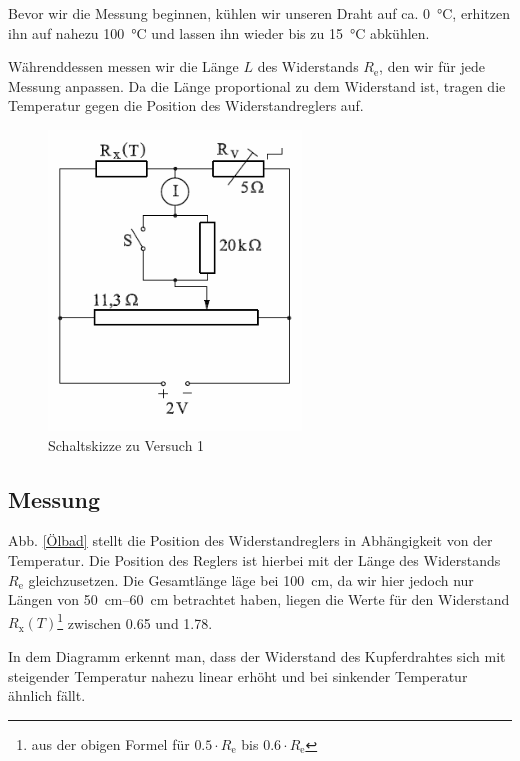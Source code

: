 \documentclass[11pt,a4paper,titlepage, ngerman]{article}
\begin{document}
			Bevor wir die Messung beginnen, kühlen wir unseren Draht auf ca. \SI{0}{\celsius}, erhitzen ihn auf nahezu \SI{100}{\celsius} und lassen ihn wieder bis zu \SI{15}{\celsius} abkühlen.
			
			Währenddessen messen wir die Länge $L$ des Widerstands $R_\text{e}$, den wir für jede Messung anpassen. Da die Länge proportional zu dem Widerstand ist, tragen die Temperatur gegen die Position des Widerstandreglers auf.
						
			\begin{figure}
				\centering
				\includegraphics[width=0.6\textwidth]{Versuch2.png}
				\caption{Schaltskizze zu Versuch 1}
				\label{Schaltskizze2}
			\end{figure}
		
		\subsection{Messung}
			
			Abb. \ref{Ölbad} stellt die Position des Widerstandreglers in Abhängigkeit von der Temperatur. Die Position des Reglers ist hierbei mit der Länge des Widerstands  $R_\text{e}$ gleichzusetzen. Die Gesamtlänge läge bei \SI{100}{cm}, da wir hier jedoch nur Längen von \SIrange{50}{60}{cm} betrachtet haben, liegen die Werte für den Widerstand $R_\text{x}(T)$\footnote{aus der obigen Formel für $0.5\cdot R_\text{e}$ bis $0.6\cdot R_\text{e}$} zwischen \SI{0,65}{\Omega} und \SI{1,78}{\Omega}.
			
			In dem Diagramm erkennt man, dass der Widerstand des Kupferdrahtes sich mit steigender Temperatur nahezu linear erhöht und bei sinkender Temperatur ähnlich fällt.
			
\end{document}
